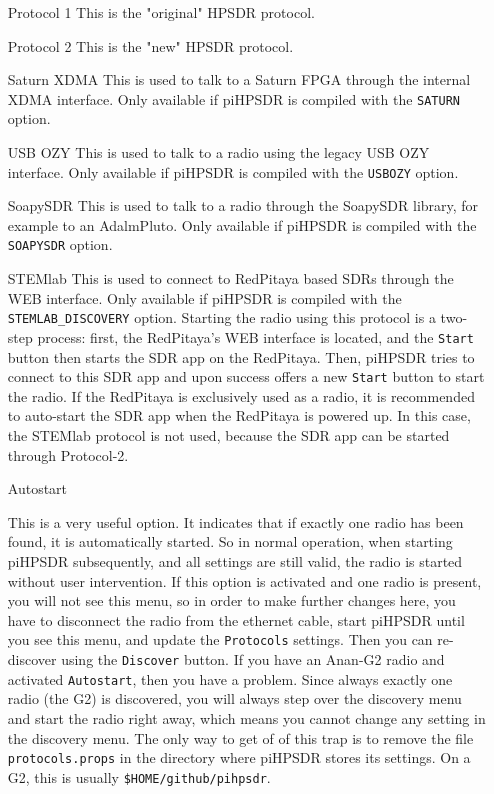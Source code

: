 \documentclass[12pt]{book}
\def\rett#1{\texttt{\color{red}#1}}
\def\pH{pi\-HPSDR\xspace}
\begin{document}
\begin{itemize}[font=\texttt, left=80pt]
\item[Protocol 1]{This is the "original" HPSDR protocol.}
\item[Protocol 2]{This is the "new" HPSDR protocol.}
\item[Saturn XDMA]{This is used to talk to a Saturn FPGA through the internal XDMA interface. Only available
if \pH is compiled with the \texttt{SATURN}  option.}
\item[USB OZY]{This is used to talk to a radio using the legacy USB OZY interface. Only available if \pH
is compiled with the \texttt{USBOZY} option.}
\item[SoapySDR]{This is used to talk to a radio through the SoapySDR library, for example to an AdalmPluto.
Only available if \pH is compiled with the \texttt{SOAPYSDR} option.}
\item[STEMlab]{This is used to connect to RedPitaya based SDRs through the WEB interface. Only available if
\pH is compiled with the \texttt{STEMLAB\_DISCOVERY} option. Starting the radio using this protocol is a
two-step process:
first, the RedPitaya's WEB interface is located, and the \texttt{Start} button then starts the SDR app
on the RedPitaya. Then, \pH tries to connect to this SDR app and upon success offers a new
\texttt{Start} button to start the radio. If the RedPitaya is exclusively used as a radio, it is recommended
to auto-start the SDR app
when the RedPitaya is powered up. In this case, the STEMlab protocol is not used, because the SDR app can be started through Protocol-2.}
\item[Autostart]{This is a very useful option. It indicates that if exactly one radio has been found, it is
automatically started. So in normal operation, when starting \pH subsequently, and all settings are
still valid, the radio is started without user intervention. If this option is activated and one radio is
present, you will not see this menu, so in order to make further changes here, you have to disconnect the
radio from the ethernet cable, start \pH until you see this menu, and update the \rett{Protocols}
settings. Then you can re-discover using the \rett{Discover} button.
If you have an Anan-G2 radio and activated \texttt{Autostart}, then you have a problem. Since always
exactly one radio (the G2) is discovered, you will always step over the discovery menu and start the
radio right away, which means you cannot change any setting in the discovery menu. The only way
to get of of this trap is to remove the file \texttt{protocols.props} in the directory where \pH
stores its settings. On a G2, this is usually \texttt{\$HOME/github/pihpsdr}.

}
\end{itemize}
\end{document}
